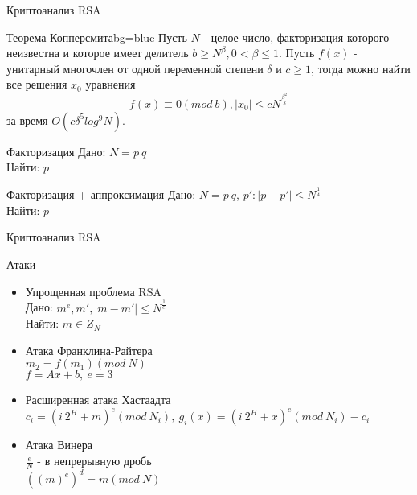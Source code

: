 \begin{frame}{Криптоанализ RSA}			

	\changefontsizes{10pt}

	\begin{importantblock}{Теорема Копперсмита}{}{bg=blue}
		Пусть $N$ - целое число, факторизация которого неизвестна и которое имеет делитель {$b \ge N^\beta, 0 < \beta \le 1$}. Пусть {$f(x)$} - 
		унитарный многочлен от одной переменной степени {$\delta$} и {$c \ge 1$}, тогда можно найти все решения {$x_0$} уравнения
		    \begin{equation}
		      f(x) \equiv 0(mod \: b), |x_0| \le c N^{\frac{\beta^2}{\delta}}
		    \end{equation}
		за время {$O(c \delta^5 log^9 N)$}.
	\end{importantblock}	 
	
	\begin{block}{Факторизация}
		Дано: $N = p \: q$ \\
		Найти: $p$
	\end{block}	

	\begin{block}{Факторизация + аппроксимация}
		Дано: $N = p \: q$, $p': |p-p'| \le N^\frac{1}{4}$ \\
		Найти: $p$
	\end{block}		 

	\changefontsizes{13pt}
	
\end{frame}

\begin{frame}{Криптоанализ RSA}	
	\begin{center}
		{\LARGE Атаки }

		\begin{itemize}
			\item Упрощенная проблема RSA \\
				Дано: {$m^e, m', |m-m'| \le N^\frac{1}{e}$} \\   
  				Найти: {$m \in Z_N$} 

			\item Атака Франклина-Райтера \\
				$m_2 = f(m_1)(mod \: N)$ \\
				$f = Ax+b, \: e = 3$
			\item Расширенная атака Хастаадта \\
				$c_i=(i \: 2^H + m)^e(mod \: N_i), \: g_i(x) = (i \: 2^H + x)^e(mod \: N_i) - c_i$
			\item Атака Винера \\
				$\frac{e}{N}$ - в непрерывную дробь \\
				$((m)^e)^d = m (mod \: N)$
		\end{itemize}
	\end{center}	
\end{frame}

